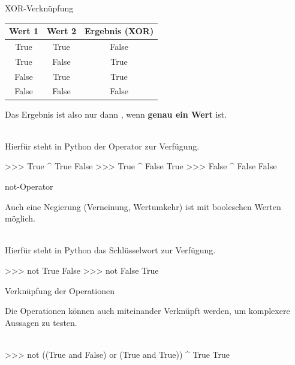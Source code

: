         
        \begin{frame}[fragile]{XOR-Verknüpfung}
            \begin{table}[]
            \centering
                \begin{tabular}{|c|c|c|}
                    \hline
                    \rowcolor[HTML]{EFEFEF} 
                    Wert 1 & Wert 2 & Ergebnis (XOR) \\ \hline
                    True   & True   & False           \\ \hline
                    True   & False  & True          \\ \hline
                    False  & True   & True          \\ \hline
                    False  & False  & False          \\ \hline
                \end{tabular}%
            \end{table}
            
           Das Ergebnis ist also nur dann , wenn \textbf{genau ein Wert }  ist.\\~\
            
            Hierfür steht in Python der Operator \code{\^} zur Verfügung.
            
\begin{pyconcode}
>>> True ^ True
False
>>> True ^ False
True
>>> False ^ False
False
\end{pyconcode}     

        \end{frame}
        
        
        \begin{frame}[fragile]{not-Operator}
            
            Auch eine Negierung (Verneinung, Wertumkehr) ist mit booleschen Werten möglich. \\~\
            
            Hierfür steht in Python das Schlüsselwort  zur Verfügung.
            
\begin{pyconcode}
>>> not True
False
>>> not False
True
\end{pyconcode}     

        \end{frame}
        
         \begin{frame}[fragile]{Verknüpfung der Operationen}
            
            Die Operationen können auch miteinander Verknüpft werden, um komplexere Aussagen zu testen. \\~\
            
\begin{pyconcode}
>>> not ((True and False) or (True and True)) ^ True
True
\end{pyconcode}     

        \end{frame}
        
